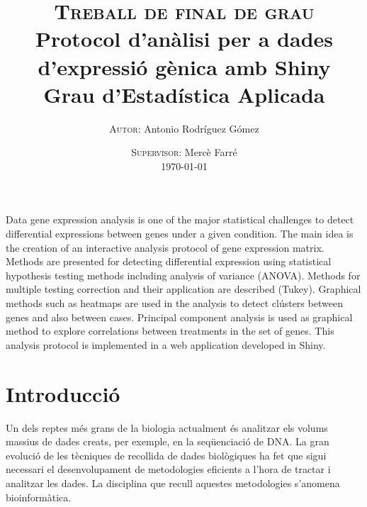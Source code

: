 \documentclass[english]{article}
\begin{document}
{\begin{list}{}{\leftmargin=3em\rightmargin=\leftmargin}
\small
 Data gene expression analysis is one of the major statistical challenges to detect differential expressions between genes under a given condition. The main idea is the creation of an interactive analysis protocol of gene expression matrix. Methods are presented for detecting differential expression using statistical hypothesis testing methods including analysis of variance (ANOVA). Methods for multiple testing correction and their application are described (Tukey). Graphical methods such as heatmaps are used in the analysis to detect clústers between genes and also between cases. Principal component analysis is used as graphical method to explore correlations between treatments in the set of genes. This analysis protocol is implemented in a web application developed in Shiny.
\end{list}\par\vspace{6mm}%
}

\title{
\textsc{Treball de final de grau}\\[2.6cm]
{\LARGE \bfseries Protocol d'anàlisi per a dades d'expressió gènica amb Shiny}\\{\Large\bfseries Grau d'Estadística Aplicada}\\[5cm]
}

\author{
\textsc{Autor:} Antonio Rodríguez Gómez
}

\date{
\textsc{Supervisor:} Mercè Farré \\[1em]
\today
}

\maketitle

\thispagestyle{empty}
\clearpage
\twocolumn[\makeAbstract]
\thispagestyle{empty}
\clearpage
\tableofcontents
\clearpage
\section{Introducció}
Un dels reptes més grans de la biologia actualment és analitzar els volums massius de dades creats, per exemple, en la seqüenciació de DNA. La gran evolució de les tècniques de recollida de dades biològiques ha fet que sigui necessari el desenvolupament de metodologies eficients a l'hora de tractar i analitzar les dades. La disciplina que recull aquestes metodologies s'anomena bioinformàtica.
\\
\end{document}
